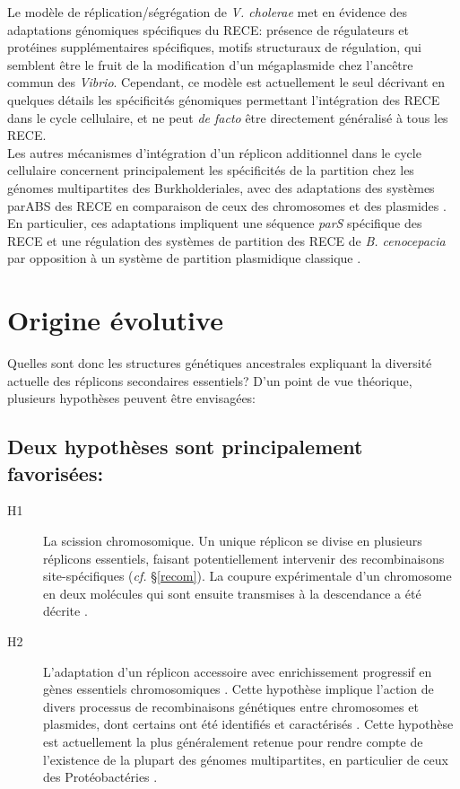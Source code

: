 	 Le modèle de réplication/ségrégation de \textit{V. cholerae} met en évidence des adaptations génomiques spécifiques du RECE: présence de régulateurs et protéines supplémentaires spécifiques, motifs structuraux de régulation, qui semblent être le fruit de la modification d'un mégaplasmide chez l'ancêtre commun des \textit{Vibrio}\citep{Heidelberg2000}. Cependant, ce modèle est actuellement le seul décrivant en quelques détails les spécificités génomiques permettant l'intégration des RECE dans le cycle cellulaire, et ne peut \textit{de facto} être directement généralisé à tous les RECE.\\
	Les autres mécanismes d'intégration d'un réplicon additionnel dans le cycle cellulaire concernent principalement les spécificités de la partition chez les génomes multipartites des Burkholderiales, avec des adaptations des systèmes parABS des RECE en comparaison de ceux des chromosomes et des plasmides \citep{Dubarry2006a,Livny2007,Passot2012}. En particulier, ces adaptations impliquent une séquence \textit{parS} spécifique des RECE et une régulation des systèmes de partition des RECE de \textit{B. cenocepacia} par opposition à un système de partition plasmidique classique \citep{Dubarry2006a}.


\section{Origine évolutive}\label{chrIIori}
	Quelles sont donc les structures génétiques ancestrales expliquant la diversité actuelle des réplicons secondaires essentiels? D'un point de vue théorique, plusieurs hypothèses peuvent être envisagées:
	
\subsection*{Deux hypothèses sont principalement favorisées:}
\begin{description}
	 \item[H1] La scission chromosomique. Un unique réplicon se divise en plusieurs réplicons essentiels, faisant potentiellement intervenir des recombinaisons site-spécifiques (\textit{cf.} \S \ref{recom}). La coupure expérimentale d'un chromosome en deux molécules qui sont ensuite  transmises à la descendance a été décrite  \citep{guo2003natural,itaya1997experimental}. 
	 \item[H2]  L'adaptation d'un réplicon accessoire avec enrichissement progressif en gènes essentiels chromosomiques  \citep{Moreno1998,Mackenzie2004}. Cette hypothèse implique l'action de divers processus de recombinaisons génétiques entre chromosomes et plasmides, dont certains ont été identifiés et caractérisés \citep{Slater2009,Guo2010,maida2014origin}. Cette hypothèse est actuellement la plus généralement retenue pour rendre compte de l'existence de la plupart des génomes multipartites, en particulier de ceux des Protéobactéries \citep{Bavishi2010}. 
\end{description}
